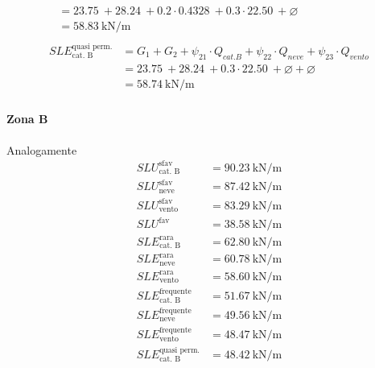 \begin{align}
\begin{split}
	&= \SI{23.75}{} + \SI{28.24}{} + 0.2\cdot\SI{0.4328}{} + 0.3\cdot\SI{22.50}{} + \varnothing\\
	&= \SI{58.83}{\kilo\newton\per\meter}
	\end{split} \\ 
	\begin{split}
	SLE^{\text{quasi perm.}}_{\text{cat. B}} &= G_1 + G_2 + \psi_{21}\cdot Q_{cat. B} + \psi_{22}\cdot Q_{neve} + \psi_{23}\cdot Q_{vento} \\
	&= \SI{23.75}{} + \SI{28.24}{} + 0.3\cdot\SI{22.50}{} + \varnothing + \varnothing \\
	&= \SI{58.74}{\kilo\newton\per\meter}
	\end{split} 
\end{align}
\paragraph*{Zona B} Analogamente
\begin{align*} 
	SLU^{\text{sfav}}_{\text{cat. B}}		&= \SI{90.23}{\kilo\newton\per\meter} \\
	SLU^{\text{sfav}}_{\text{neve}} 		&= \SI{87.42}{\kilo\newton\per\meter} \\
	SLU^{\text{sfav}}_{\text{vento}} 		&= \SI{83.29}{\kilo\newton\per\meter} \\
	SLU^{\text{fav}} 						&= \SI{38.58}{\kilo\newton\per\meter} \\	
	SLE^{\text{rara}}_{\text{cat. B}} 		&= \SI{62.80}{\kilo\newton\per\meter} \\
	SLE^{\text{rara}}_{\text{neve}}			&= \SI{60.78}{\kilo\newton\per\meter} \\
	SLE^{\text{rara}}_{\text{vento}} 		&= \SI{58.60}{\kilo\newton\per\meter} \\
	SLE^{\text{frequente}}_{\text{cat. B}} 	&= \SI{51.67}{\kilo\newton\per\meter} \\
	SLE^{\text{frequente}}_{\text{neve}} 	&= \SI{49.56}{\kilo\newton\per\meter} \\
	SLE^{\text{frequente}}_{\text{vento}} 	&= \SI{48.47}{\kilo\newton\per\meter} \\
	SLE^{\text{quasi perm.}}_{\text{cat. B}}&= \SI{48.42}{\kilo\newton\per\meter}
\end{align*}
%
